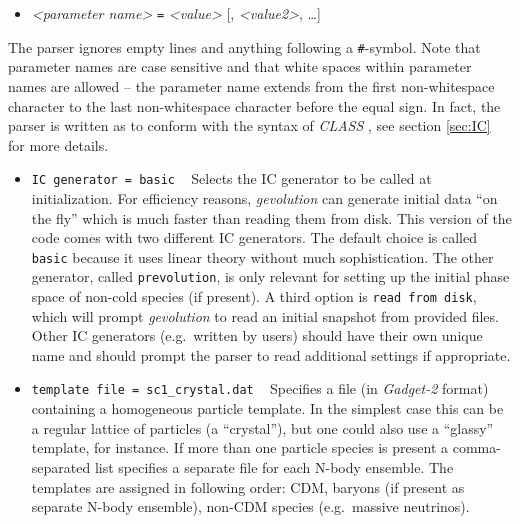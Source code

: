 \documentclass[a4paper,10pt]{article}
\begin{document}
\begin{itemize}
 \item[] \textit{<parameter name>} \texttt{=} \textit{<value>} [, \textit{<value2>}, \ldots]
\end{itemize}

\noindent The parser ignores empty lines and anything following a \texttt{\#}-symbol. Note that parameter names are case sensitive and that 
white spaces within parameter names are allowed -- the parameter name extends from the first non-whitespace character to the last
non-whitespace character before the equal sign. In fact, the parser is written as to conform with the syntax of \textit{CLASS}
\cite{Blas:2011rf}, see section \ref{sec:IC} for more details.

\begin{itemize}
 \item[] \hspace{-25pt}\texttt{IC generator = basic} ~ Selects the IC generator to be called at initialization. For efficiency reasons,
 \textit{gevolution} can generate initial data ``on the fly'' which is much faster than reading them from disk. This version of the code
 comes with two different IC generators. The default choice is called \texttt{basic} because it uses linear theory without much
 sophistication. The other generator, called \texttt{prevolution}, is only relevant for setting up the initial phase space of non-cold
 species (if present). A third option is \texttt{read~from~disk}, which will prompt \textit{gevolution} to read an initial snapshot from
 provided files. Other IC generators (e.g.\ written by users) should have their own unique name and should prompt the parser to read
 additional settings if appropriate.
 \item[] \hspace{-25pt}\texttt{template file = sc1\_crystal.dat} ~ Specifies a file (in \textit{Gadget-2} format) containing a homogeneous
 particle template. In the simplest case this can be a regular lattice of particles (a ``crystal''), but one could also use a ``glassy''
 template, for instance. If more than one particle species is present a comma-separated list specifies a separate file for each N-body
 ensemble. The templates are assigned in following order: CDM, baryons (if present as separate N-body ensemble), non-CDM species (e.g.\
 massive neutrinos).
 

\end{itemize}
\end{document}
